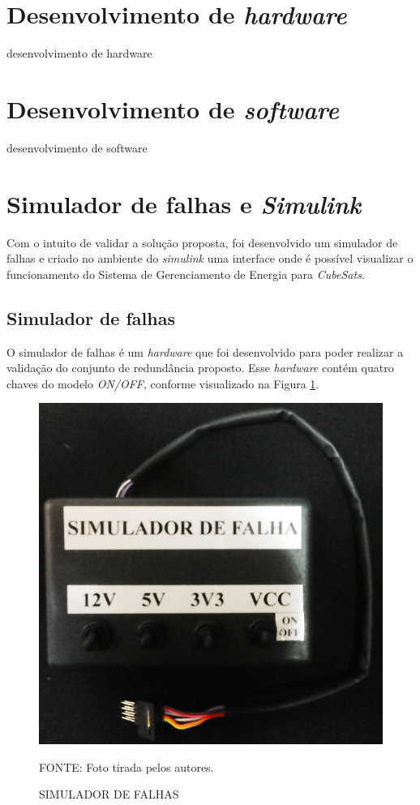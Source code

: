 \documentclass[
	12pt,				%
	openright,			%
	oneside,			%
	a4paper,			%
	english,			%
	french,				%
	spanish,			%
	brazil,				%
	oldfontcommands
	]{abntex2}
\begin{document}
\section[Desenvolvimento de hardware]{Desenvolvimento de \textit{hardware}}

desenvolvimento de hardware

\section[Desenvolvimento de software]{Desenvolvimento de \textit{software}}

desenvolvimento de software

\section[Simulador de falhas e Simulink]{Simulador de falhas e \textit{Simulink}}

	Com o intuito de validar a solução proposta, foi desenvolvido um simulador de falhas e criado no ambiente do \textit{simulink} uma interface onde é possível visualizar o funcionamento do Sistema de Gerenciamento de Energia para \textit{CubeSats}.
	
\subsection[Simulador de falhas]{Simulador de falhas}

	O simulador de falhas é um \textit{hardware} que foi desenvolvido para poder realizar a validação do conjunto de redundância proposto. Esse \textit{hardware} contém quatro chaves do modelo \textit{ON/OFF}, conforme visualizado na Figura \ref{Fig_Simulador}.
	
	\begin{figure}[th]
		\caption{SIMULADOR DE FALHAS}
		\label{Fig_Simulador}
		\centering
		\includegraphics[width=0.5\linewidth]{./figs/Simulador}
			
		\begin{small}
			FONTE: Foto tirada pelos autores.
		\end{small}		
	\end{figure}
	\pagebreak
\end{document}
